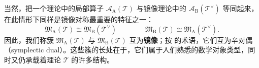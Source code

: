 当然，把一个理论中的局部算子 $\mathcal{A}_{\operatorname{A}}(\mathcal{T})$ 与镜像理论中的 $\mathcal{A}_{\operatorname{B}}(\mathcal{T}^{\vee})$ 等同起来，在此情形下同样是镜像对称最重要的特征之一：
\[\mathfrak{M}_{\operatorname{A}}(\mathcal{T})\cong \mathfrak{M}_{\operatorname{B}}(\mathcal{T}^{\vee})\qquad \qquad \mathfrak{M}_{\operatorname{B}}(\mathcal{T})\cong \mathfrak{M}_{\operatorname{A}}(\mathcal{T}^{\vee}).\]
因此，我们称簇 $\mathfrak{M}_{\operatorname{A}}(\mathcal{T})$ 与 $\mathfrak{M}_{\operatorname{B}}(\mathcal{T})$ 互为\textbf{镜像}；按 \cite{BLPWgco} 的术语，它们互为辛对偶（symplectic dual）。这些簇的长处在于，它们属于人们熟悉的数学对象类型，同时又仍承载着理论 $\mathcal{T}$ 的许多结构。

